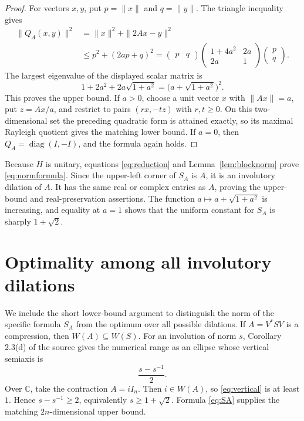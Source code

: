 \documentclass[11pt]{article}
\newcommand{\C}{\mathbb C}
\begin{document}
\begin{proof}
For vectors \(x,y\), put \(p=\|x\|\) and \(q=\|y\|\).  The triangle
inequality gives
\begin{align*}
 \|Q_A(x,y)\|^2
 &=\|x\|^2+\|2Ax-y\|^2\\
 &\le p^2+(2ap+q)^2
 =\begin{pmatrix}p&q\end{pmatrix}
   \begin{pmatrix}1+4a^2&2a\\2a&1\end{pmatrix}
   \begin{pmatrix}p\\q\end{pmatrix}.
\end{align*}
The largest eigenvalue of the displayed scalar matrix is
\[
 1+2a^2+2a\sqrt{1+a^2}
 =\bigl(a+\sqrt{1+a^2}\bigr)^2.
\]
This proves the upper bound.  If \(a>0\), choose a unit vector \(x\) with
\(\|Ax\|=a\), put \(z=Ax/a\), and restrict to pairs \((rx,-tz)\) with
\(r,t\ge0\).  On this two-dimensional set the preceding quadratic form is
attained exactly, so its maximal Rayleigh quotient gives the matching lower
bound.  If \(a=0\), then \(Q_A=\operatorname{diag}(I,-I)\), and the formula
again holds.
\end{proof}

Because \(H\) is unitary, equations \eqref{eq:reduction} and
Lemma~\ref{lem:blocknorm} prove \eqref{eq:normformula}.  Since the upper-left
corner of \(S_A\) is \(A\), it is an involutory dilation of \(A\).  It has
the same real or complex entries as \(A\), proving the upper-bound and
real-preservation assertions.  The function
\(a\mapsto a+\sqrt{1+a^2}\) is increasing, and equality at \(a=1\) shows
that the uniform constant for \(S_A\) is sharply \(1+\sqrt2\).

\section{Optimality among all involutory dilations}

We include the short lower-bound argument to distinguish the norm of the
specific formula \(S_A\) from the optimum over all possible dilations.
If \(A=V^*SV\) is a compression, then \(W(A)\subseteq W(S)\).  For an
involution of norm \(s\), Corollary 2.3(d) of the source gives the numerical
range as an ellipse whose vertical semiaxis is
\begin{equation}\label{eq:vertical}
 \frac{s-s^{-1}}2.
\end{equation}
Over \(\C\), take the contraction \(A=iI_n\).  Then \(i\in W(A)\), so
\eqref{eq:vertical} is at least \(1\).  Hence
\(s-s^{-1}\ge2\), equivalently \(s\ge1+\sqrt2\).  Formula
\eqref{eq:SA} supplies the matching \(2n\)-dimensional upper bound.
\end{document}
